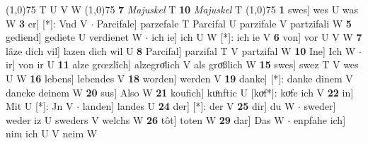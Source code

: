 \documentclass[8pt,a4paper,notitlepage]{article}
\begin{document}
\begin{table}[ht]
\begin{minipage}[t]{0.5\linewidth}
\scriptsize
\line(1,0){75} \newline
T U V W \newline
\line(1,0){75} \newline
\textbf{7} \textit{Majuskel} T  \textbf{10} \textit{Majuskel} T  \newline
\line(1,0){75} \newline
\textbf{1} swes] wes U was W \textbf{3} er] [*]: Vnd V  $\cdot$ Parcifale] parzefale T Parcifal U parzifale V partzifali W \textbf{5} gediend] gediete U verdienet W  $\cdot$ ich ie] ich U W [*]: ich ie V \textbf{6} von] vor U V W \textbf{7} lâze dich vil] lazen dich wil U \textbf{8} Parcifal] parzifal T V partzifal W \textbf{10} Ine] Ich W  $\cdot$ ir] von ir U \textbf{11} alze grœzlîch] alzegroͤlich V als groͤßlich W \textbf{15} swes] swez T V wes U W \textbf{16} lebens] lebendes V \textbf{18} worden] werden V \textbf{19} danke] [*]: danke dinem V dancke deinem W \textbf{20} sus] Also W \textbf{21} koufich] kuͦnftic U [koͮf*]: koͮfe ich V \textbf{22} in] Mit U [*]: Jn V  $\cdot$ landen] landes U \textbf{24} der] [*]: der V \textbf{25} dir] du W  $\cdot$ sweder] weder iz U sweders V welchs W \textbf{26} tôt] toten W \textbf{29} dar] Das W  $\cdot$ enpfahe ich] nim ich U V neim W \newline
\end{minipage}
\end{table}
\end{document}
